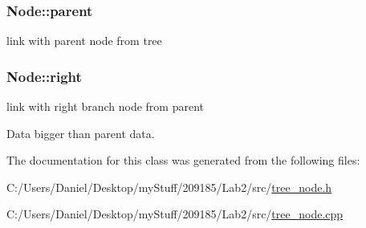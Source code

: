 \subsubsection[{parent}]{\setlength{\rightskip}{0pt plus 5cm}Node\+::parent\hspace{0.3cm}{\ttfamily [private]}}\label{class_node_a2149dcf83c930a3c0b388f51dbb42410}


link with parent node from tree 

\hypertarget{class_node_a45c7b7ddeefcffe349a1f13ec586107c}{}
\subsubsection[{right}]{\setlength{\rightskip}{0pt plus 5cm}Node\+::right\hspace{0.3cm}{\ttfamily [private]}}\label{class_node_a45c7b7ddeefcffe349a1f13ec586107c}


link with right branch node from parent 

Data bigger than parent data. 

The documentation for this class was generated from the following files\+:\begin{DoxyCompactItemize}
\item 
C\+:/\+Users/\+Daniel/\+Desktop/my\+Stuff/209185/\+Lab2/src/\hyperlink{tree__node_8h}{tree\+\_\+node.\+h}\item 
C\+:/\+Users/\+Daniel/\+Desktop/my\+Stuff/209185/\+Lab2/src/\hyperlink{tree__node_8cpp}{tree\+\_\+node.\+cpp}\end{DoxyCompactItemize}
